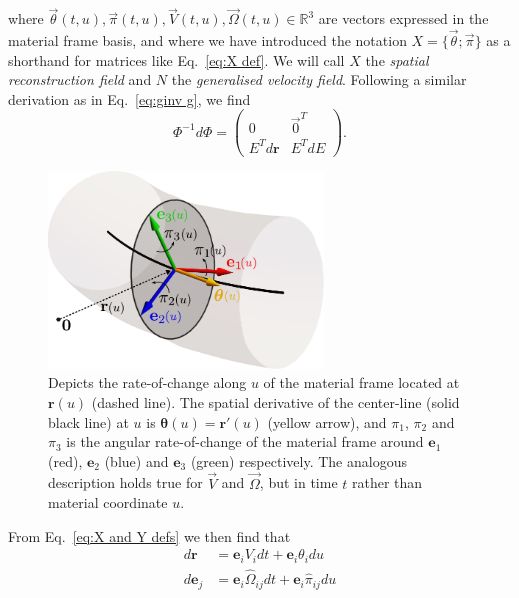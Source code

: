 where $\vec{\theta}(t,u), \vec{\pi}(t,u), \vec{V}(t,u), \vec{\Omega}(t,u) \in \mathbb{R}^3$ are vectors expressed in the material frame basis, and where we have introduced the notation $X = \{ \vec{\theta} ; \vec{\pi} \}$ as a shorthand for matrices like Eq.~\ref{eq:X def}. We will call $X$ the \textit{spatial reconstruction field} and $N$ the \textit{generalised velocity field}. Following a similar derivation as in Eq.~\ref{eq:ginv g}, we find
\begin{equation}
\Phi^{-1} d \Phi = \begin{pmatrix}
0 & \vec{0}^T \\
E^T d \mathbf{r} & E^T d E
\end{pmatrix}.
\end{equation}
\begin{figure}[t]
\centering
        \includegraphics[width=0.65\textwidth]{figs_part2/sec7.2.1_cosserat_rod_kinematics/theta_and_pi_explanation.pdf}
        \caption{Depicts the rate-of-change along $u$ of the material frame located at $\mathbf{r}(u)$ (dashed line). The spatial derivative of the center-line (solid black line) at $u$ is $\boldsymbol{\theta}(u) = \mathbf{r}'(u)$ (yellow arrow), and $\pi_1$, $\pi_2$ and $\pi_3$ is the angular rate-of-change of the material frame around $\mathbf{e}_1$ (red), $\mathbf{e}_2$ (blue) and $\mathbf{e}_3$ (green) respectively. The analogous description holds true for $\vec{V}$ and $\vec{\Omega}$, but in time $t$ rather than material coordinate $u$.}
        \label{fig:rate-of-change of material frame}
\end{figure}
From Eq.~\ref{eq:X and Y defs} we then find that
\begin{subequations} \label{eq:dr and de}
\begin{align}
d \mathbf{r} & = \mathbf{e}_i V_i dt + \mathbf{e}_i \theta_i du \\
d \mathbf{e}_j & = \mathbf{e}_i \hat{\Omega}_{ij} dt + \mathbf{e}_i \hat{\pi}_{ij} du \label{eq:de_j}
\end{align}
\end{subequations}

